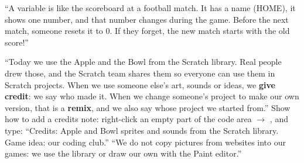 \begin{analogy}[A scoreboard]
\enquote{A variable is like the scoreboard at a football match. It has a name (HOME), it shows one number, and that number changes during the game. Before the next match, someone resets it to 0. If they forget, the new match starts with the old score!}
\end{analogy}

\begin{safety}
\enquote{Today we use the Apple and the Bowl from the Scratch library. Real people drew those, and the Scratch team shares them so everyone can use them in Scratch projects. When we use someone else's art, sounds or ideas, we \textbf{give credit}: we say who made it. When we change someone's project to make our own version, that is a \textbf{remix}, and we also say whose project we started from.}
Show how to add a credits note: right-click an empty part of the code area $\rightarrow$ , and type: \enquote{Credits: Apple and Bowl sprites and sounds from the Scratch library. Game idea: our coding club.} \enquote{We do not copy pictures from websites into our games: we use the library or draw our own with the Paint editor.}
\end{safety}

